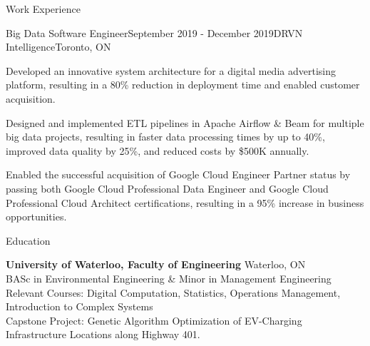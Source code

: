 \documentclass{resume} %
\begin{document}
\begin{rSection}{Work Experience}
\begin{rSubsection}{Big Data Software Engineer}{September 2019 - December 2019}{DRVN Intelligence}{Toronto, ON}
\item Developed an innovative system architecture for a digital media advertising platform, resulting in a 80\% reduction in deployment time and enabled customer acquisition.
\item Designed and implemented ETL pipelines in Apache Airflow \& Beam for multiple big data projects, resulting in faster data processing times by up to 40\%, improved data quality by 25\%, and reduced costs by \$500K annually.
\item Enabled the successful acquisition of Google Cloud Engineer Partner status by passing both Google Cloud Professional Data Engineer and Google Cloud Professional Cloud Architect certifications, resulting in a 95\% increase in business opportunities.
\end{rSubsection}

\end{rSection}






\begin{rSection}{Education}

{\bf University of Waterloo, Faculty of Engineering} \hfill {Waterloo, ON} \\
BASc in Environmental Engineering \& Minor in Management Engineering \\
Relevant Courses: Digital Computation, Statistics, Operations Management, Introduction to Complex Systems
\\
Capstone Project: Genetic Algorithm Optimization of EV-Charging Infrastructure Locations along Highway 401. 

\end{rSection}
\end{document}
